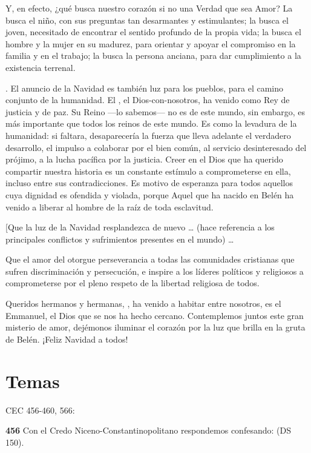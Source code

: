 Y, en efecto, ¿qué busca nuestro corazón si no una Verdad que sea Amor? La busca el niño, con sus preguntas tan desarmantes y estimulantes; la busca el joven, necesitado de encontrar el sentido profundo de la propia vida; la busca el hombre y la mujer en su madurez, para orientar y apoyar el compromiso en la familia y en el trabajo; la busca la persona anciana, para dar cumplimiento a la existencia terrenal.

. El anuncio de la Navidad es también luz para los pueblos, para el camino conjunto de la humanidad. El , el Dios-con-nosotros, ha venido como Rey de justicia y de paz. Su Reino ---lo sabemos--- no es de este mundo, sin embargo, es más importante que todos los reinos de este mundo. Es como la levadura de la humanidad: si faltara, desaparecería la fuerza que lleva adelante el verdadero desarrollo, el impulso a colaborar por el bien común, al servicio desinteresado del prójimo, a la lucha pacífica por la justicia. Creer en el Dios que ha querido compartir nuestra historia es un constante estímulo a comprometerse en ella, incluso entre sus contradicciones. Es motivo de esperanza para todos aquellos cuya dignidad es ofendida y violada, porque Aquel que ha nacido en Belén ha venido a liberar al hombre de la raíz de toda esclavitud.

{[}Que la luz de la Navidad resplandezca de nuevo \ldots{} (hace referencia a los principales conflictos y sufrimientos presentes en el mundo) \ldots{}

Que el amor del  otorgue perseverancia a todas las comunidades cristianas que sufren discriminación y persecución, e inspire a los líderes políticos y religiosos a comprometerse por el pleno respeto de la libertad religiosa de todos.

Queridos hermanos y hermanas, , ha venido a habitar entre nosotros, es el Emmanuel, el Dios que se nos ha hecho cercano. Contemplemos juntos este gran misterio de amor, dejémonos iluminar el corazón por la luz que brilla en la gruta de Belén. ¡Feliz Navidad a todos!


\section{Temas}


CEC 456-460, 566:

\textbf{456} Con el Credo Niceno-Constantinopolitano respondemos confesando:  (DS 150).


